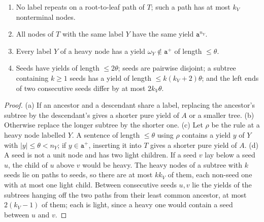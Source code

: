 \begin{lemma}
\label{lem:app-h-tree}
\begin{enumerate}[label=\textup{(\alph*)},leftmargin=*]
\item No label repeats on a root-to-leaf path of $T$; such a path has at
most $k_V$ nonterminal nodes.
\item All nodes of $T$ with the same label $Y$ have the same yield
$\mathtt a^{n_Y}$.
\item Every label $Y$ of a heavy node has a yield $\omega_Y\notin\mathtt a^+$ of
length $\le\theta$.
\item Seeds have yields of length $\le2\theta$; seeds are pairwise disjoint;
a subtree containing $k\ge1$ seeds has a yield of length $\le k(k_V+2)\theta$; and
the left ends of two consecutive seeds differ by at most $2k_V\theta$.
\end{enumerate}
\end{lemma}

\begin{proof}
(a) If an ancestor and a descendant share a label, replacing the ancestor's
subtree by the descendant's gives a shorter pure yield of $A$ or a smaller
tree.  (b) Otherwise replace the longer subtree by the shorter one.  (c) Let
$\rho$ be the rule at a heavy node labelled $Y$.  A sentence of length
$\le\theta$ using $\rho$ contains a yield $y$ of $Y$ with $|y|\le\theta<n_Y$;
if $y\in\mathtt a^+$, inserting it into $T$ gives a shorter pure yield of $A$.
(d) A seed is not a unit node and has two light children.  If a seed $v$ lay
below a seed $u$, the child of $u$ above $v$ would be heavy.  The heavy nodes of
a subtree with $k$ seeds lie on paths to seeds, so there are at most $kk_V$ of
them, each non-seed one with at most one light child.  Between consecutive
seeds $u,v$ lie the yields of the subtrees hanging off the two paths from
their least common ancestor, at most $2(k_V-1)$ of them; each is light, since a
heavy one would contain a seed between $u$ and $v$.
\end{proof}

